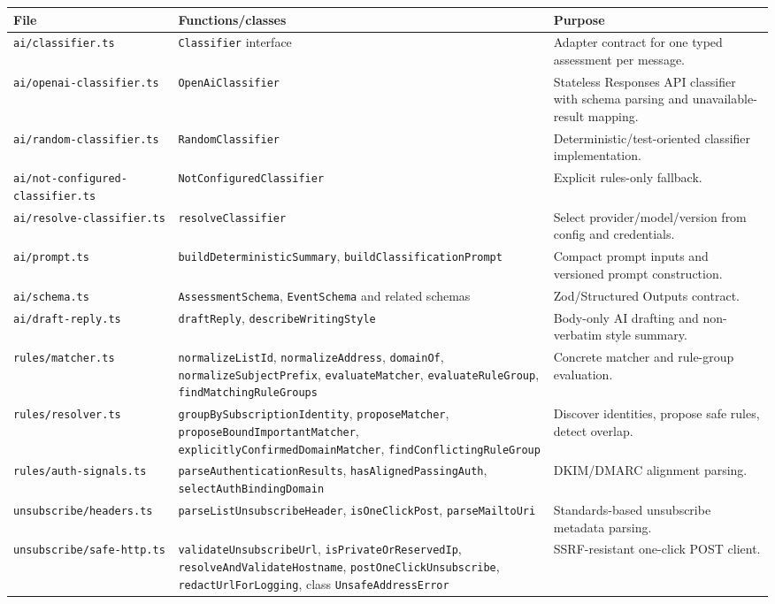 \documentclass[12pt,oneside]{book}
\newcommand{\code}[1]{\nolinkurl{#1}}
\newcommand{\file}[1]{\nolinkurl{#1}}
\begin{document}
\begingroup\scriptsize
\begin{longtable}{P{3.6cm}P{5.8cm}P{7.0cm}}
\toprule
\textbf{File} & \textbf{Functions/classes} & \textbf{Purpose} \\
\midrule
\endhead
\file{ai/classifier.ts} & \code{Classifier} interface & Adapter contract for one typed assessment per message. \\
\file{ai/openai-classifier.ts} & \code{OpenAiClassifier} & Stateless Responses API classifier with schema parsing and unavailable-result mapping. \\
\file{ai/random-classifier.ts} & \code{RandomClassifier} & Deterministic/test-oriented classifier implementation. \\
\file{ai/not-configured-classifier.ts} & \code{NotConfiguredClassifier} & Explicit rules-only fallback. \\
\file{ai/resolve-classifier.ts} & \code{resolveClassifier} & Select provider/model/version from config and credentials. \\
\file{ai/prompt.ts} & \code{buildDeterministicSummary}, \code{buildClassificationPrompt} & Compact prompt inputs and versioned prompt construction. \\
\file{ai/schema.ts} & \code{AssessmentSchema}, \code{EventSchema} and related schemas & Zod/Structured Outputs contract. \\
\file{ai/draft-reply.ts} & \code{draftReply}, \code{describeWritingStyle} & Body-only AI drafting and non-verbatim style summary. \\
\file{rules/matcher.ts} & \code{normalizeListId}, \code{normalizeAddress}, \code{domainOf}, \code{normalizeSubjectPrefix}, \code{evaluateMatcher}, \code{evaluateRuleGroup}, \code{findMatchingRuleGroups} & Concrete matcher and rule-group evaluation. \\
\file{rules/resolver.ts} & \code{groupBySubscriptionIdentity}, \code{proposeMatcher}, \code{proposeBoundImportantMatcher}, \code{explicitlyConfirmedDomainMatcher}, \code{findConflictingRuleGroup} & Discover identities, propose safe rules, detect overlap. \\
\file{rules/auth-signals.ts} & \code{parseAuthenticationResults}, \code{hasAlignedPassingAuth}, \code{selectAuthBindingDomain} & DKIM/DMARC alignment parsing. \\
\file{unsubscribe/headers.ts} & \code{parseListUnsubscribeHeader}, \code{isOneClickPost}, \code{parseMailtoUri} & Standards-based unsubscribe metadata parsing. \\
\file{unsubscribe/safe-http.ts} & \code{validateUnsubscribeUrl}, \code{isPrivateOrReservedIp}, \code{resolveAndValidateHostname}, \code{postOneClickUnsubscribe}, \code{redactUrlForLogging}, class \code{UnsafeAddressError} & SSRF-resistant one-click POST client. \\

\end{longtable}
\end{document}
